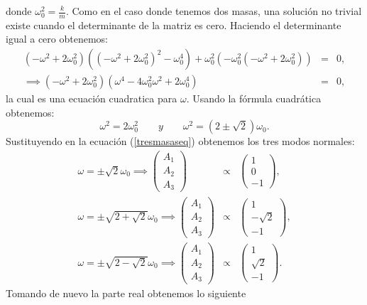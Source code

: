 \documentclass[letterpaper,12pt,oneside]{book}
\begin{document}
%
donde $\omega_0^2 = \frac{k}{m}$. Como en el caso donde tenemos dos masas, una soluci\'on no trivial existe cuando el determinante de la matriz es cero. Haciendo el determinante igual a cero obtenemos:
%
\begin{eqnarray}
(-\omega^2 +2\omega_0^2)((-\omega^2+2\omega_0^2)^2 -\omega_0^4)+\omega_0^2(-\omega_0^2(-\omega^2+2\omega_0^2))&=&0,\\
\implies (-\omega^2+2\omega_0^2)(\omega^4-4\omega_0^2\omega^2+2\omega_0^4)&=&0,
\end{eqnarray}
%
la cual es una ecuaci\'on cuadratica para $\omega$. Usando la f\'ormula cuadr\'atica obtenemos:
$$\omega^2=2\omega_0^2 \qquad y \qquad \omega^2 = (2 \pm \sqrt{2})\omega_0.$$
Sustituyendo en la ecuaci\'on (\ref{tresmasaseq}) obtenemos los tres modos normales:
%
\begin{eqnarray}
\omega = \pm\sqrt{2}\omega_0 \implies \begin{pmatrix}
A_1 \\
A_2 \\
A_3 
\end{pmatrix} &\propto& \begin{pmatrix}
1 \\
0 \\
-1 
\end{pmatrix},\\
\omega = \pm\sqrt{2+\sqrt{2}}\omega_0 \implies \begin{pmatrix}
A_1 \\
A_2 \\
A_3 
\end{pmatrix} &\propto& \begin{pmatrix}
1 \\
-\sqrt{2} \\
-1 
\end{pmatrix},\\
\omega = \pm\sqrt{2-\sqrt{2}}\omega_0 \implies \begin{pmatrix}
A_1 \\
A_2 \\
A_3 
\end{pmatrix} &\propto& \begin{pmatrix}
1 \\
\sqrt{2} \\
-1 
\end{pmatrix}.   
\end{eqnarray}
%
Tomando de nuevo la parte real obtenemos lo siguiente
\end{document}
